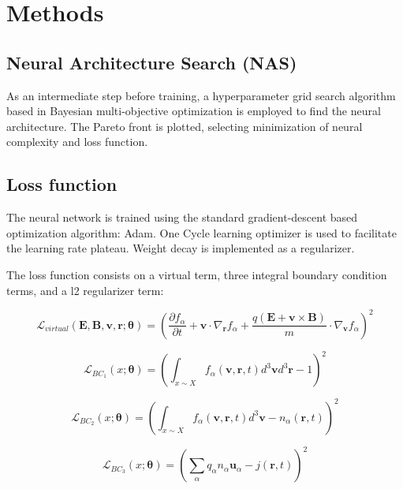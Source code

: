 \documentclass[12pt]{article}
\begin{document}
\section{Methods}

\subsection{Neural Architecture Search (NAS)}
As an intermediate step before training, a hyperparameter grid search algorithm based in Bayesian multi-objective optimization is employed to find the neural architecture. The Pareto front is plotted, selecting minimization of neural complexity and loss function.

\subsection{Loss function}
The neural network is trained using the standard gradient-descent based optimization algorithm: Adam. One Cycle learning optimizer is used to facilitate the learning rate plateau. Weight decay is implemented as a regularizer.

The loss function consists on a virtual term, three integral boundary condition terms, and a l2 regularizer term:

\begin{equation}
    \mathcal{L}_{virtual}\left(\mathbf{E}, \mathbf{B}, \mathbf{v}, \mathbf{r}; \mathbf{\theta}\right) = \left(\frac{\partial f_{\alpha}}{\partial t} + \mathbf{v} \cdot \nabla_{\mathbf{r}}  f_{\alpha} + \frac{q (\mathbf{E} + \mathbf{v} \times \mathbf{B})}{m} \cdot \nabla_{\mathbf{v}} f_\alpha \right)^2
\end{equation}

\begin{equation}
    \mathcal{L}_{BC_1} \left(x; \mathbf{\theta}\right) = \left(\int_{x \sim X} f_\alpha (\mathbf{v}, \mathbf{r}, t) d^3\mathbf{v} d^3\mathbf{r} - 1\right)^2
\end{equation}

\begin{equation}
    \mathcal{L}_{BC_2} \left(x; \mathbf{\theta}\right) = \left(\int_{x \sim X} f_\alpha (\mathbf{v}, \mathbf{r}, t) d^3\mathbf{v} - n_\alpha(\mathbf{r}, t) \right)^2
\end{equation}

\begin{equation}
    \mathcal{L}_{BC_3} \left(x; \mathbf{\theta}\right) = \left(\sum_{\alpha} q_\alpha n_\alpha  \mathbf{u}_\alpha- j(\mathbf{r}, t) \right)^2
\end{equation}
\end{document}
